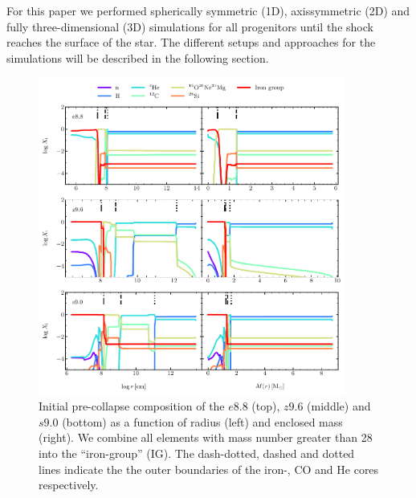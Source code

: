 \documentclass[fleqn,usenatbib]{mnras}
\begin{document}
For this paper we performed spherically symmetric (1D), axissymmetric (2D) and fully three-dimensional (3D) simulations for all progenitors until the shock reaches the surface of the star. The different setups and approaches for the simulations will be described in the following section.
\begin{figure}
 \centering
 \includegraphics[width=0.9\textwidth,trim=0cm 0.0cm 0cm 0cm,clip]{./pic/composition_all.pdf}
 \caption{Initial pre-collapse composition of the $e8.8$ (top), $z9.6$ (middle) and $s9.0$ (bottom) as a function of radius (left) and enclosed mass (right). We combine all elements with mass number greater than 28 into the ``iron-group'' (IG). The dash-dotted, dashed and dotted lines indicate the the outer boundaries of the iron-, CO and He cores respectively.}
 \label{fig:composition_all}
\end{figure}
\end{document}
